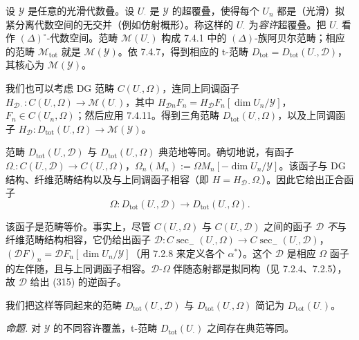 
 设 $\mathcal{Y}$ 是任意的光滑代数叠。设 $U_{\cdot}$ 是 $\mathcal{Y}$ 的超覆叠，使得每个 $U_{n}$ 都是（光滑）拟紧分离代数空间的无交并（例如仿射概形）。称这样的 $U_{\cdot}$ 为\emph{容许}超覆叠。把 $U_{\cdot}$ 看作 $(\Delta)^{\circ}$-代数空间。范畴 $\mathcal{M}(U_{\cdot})$ 构成 7.4.1 中的 $(\Delta)$-族阿贝尔范畴；相应的范畴 $\mathcal{M}_{\mathrm{tot}}$ 就是 $\mathcal{M}(\mathcal{Y})$。依 7.4.7，得到相应的 t-范畴 $D_{\mathrm{tot}}=D_{\mathrm{tot}}(U_{\cdot},\mathcal{D})$，其核心为 $\mathcal{M}(\mathcal{Y})$。

我们也可以考虑 DG 范畴 $C(U_{\cdot},\Omega)$，连同上同调函子 $H_{\mathcal{D}\cdot}:C(U_{\cdot},\Omega)\to\mathcal{M}(U_{\cdot})$，其中 $H_{\mathcal{D}n}F_{n}=H_{\mathcal{D}}F_{n}[\dim U_{n}/\mathcal{Y}]$，$F_{n}\in C(U_{n},\Omega)$；然后应用 7.4.11。得到三角范畴 $D_{\mathrm{tot}}(U_{\cdot},\Omega)$，以及上同调函子 $H_{\mathcal{D}}:D_{\mathrm{tot}}(U_{\cdot},\Omega)\to\mathcal{M}(\mathcal{Y})$。

范畴 $D_{\mathrm{tot}}(U_{\cdot},\mathcal{D})$ 与 $D_{\mathrm{tot}}(U_{\cdot},\Omega)$ 典范地等同。确切地说，有函子 $\Omega_{\cdot}:C(U_{\cdot},\mathcal{D})\to C(U_{\cdot},\Omega)$，$\Omega_{n}(M_{n}):=\Omega M_{n}[-\dim U_{n}/\mathcal{Y}]$。该函子与 DG 结构、纤维范畴结构以及与上同调函子相容（即 $H=H_{\mathcal{D}\cdot}\Omega_{\cdot}$）。因此它给出正合函子
\begin{equation}\tag{315}
\Omega:D_{\mathrm{tot}}(U_{\cdot},\mathcal{D})\to D_{\mathrm{tot}}(U_{\cdot},\Omega).
\end{equation}

该函子是范畴等价。事实上，尽管 $C(U_{\cdot},\Omega)$ 与 $C(U_{\cdot},\mathcal{D})$ 之间的函子 $\mathcal{D}$ \emph{不}与纤维范畴结构相容，它仍给出函子 $\mathcal{D}:C\sec_{-}(U_{\cdot},\Omega)\to C\sec_{-}(U_{\cdot},\mathcal{D})$，$(\mathcal{D}F)_{n}=\mathcal{D}F_{n}[\dim U_{n}/\mathcal{Y}]$（用 7.2.8 来定义各个 $\alpha^{*}$）。这个 $\mathcal{D}$ 是相应 $\Omega$ 函子的左伴随，且与上同调函子相容。$\mathcal{D}$-$\Omega$ 伴随态射都是拟同构（见 7.2.4、7.2.5），故 $\mathcal{D}$ 给出 (315) 的逆函子。


我们把这样等同起来的范畴 $D_{\mathrm{tot}}(U_{\cdot},\mathcal{D})$ 与 $D_{\mathrm{tot}}(U_{\cdot},\Omega)$ 简记为 $D_{\mathrm{tot}}(U_{\cdot})$。

 \emph{命题.} 对 $\mathcal{Y}$ 的不同容许覆盖，t-范畴 $D_{\mathrm{tot}}(U_{\cdot})$ 之间存在典范等同。

